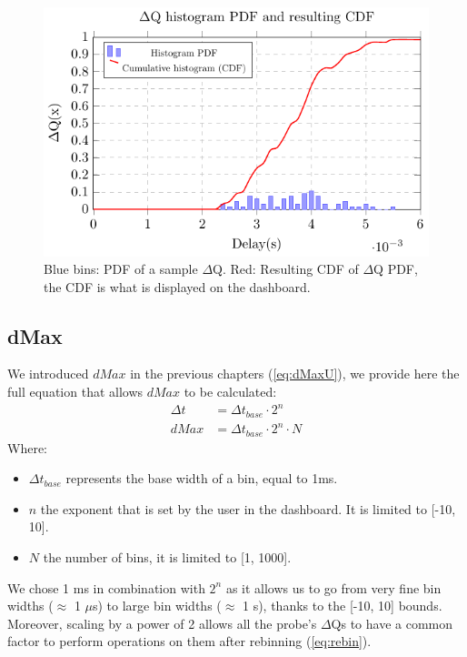     \begin{figure}[H]
            \begin{center}
                \includegraphics[scale=1]{tikz/pdf_dq.pdf} 
            \end{center}
            \caption{Blue bins: PDF of a sample $\Delta$Q. Red: Resulting CDF of $\Delta$Q PDF, the CDF is what is displayed on the dashboard.}
        \end{figure}

    \subsection{dMax}
        We introduced $dMax$ in the previous chapters (\cref{eq:dMaxU}), we provide here the full equation that allows $dMax$ to be calculated:
        \begin{equation}
            \begin{split}
                \Delta t &= \Delta t_{base} \cdot 2^n \\ 
                dMax &= \Delta t_{base} \cdot 2^n \cdot N  
            \end{split}
            \label{eq:dMaxU}
        \end{equation}
        Where:
        \begin{itemize}
            \item $\Delta t_{base}$ represents the base width of a bin, equal to 1ms.
            \item $n$ the exponent that is set by the user in the dashboard. It is limited to [-10, 10].
            \item $N$ the number of bins, it is limited to [1, 1000].
        \end{itemize}
            We chose 1 ms in combination with $2^n$ as it allows us to go from very fine bin widths ($\approx$ 1 $\mu$s) to large bin widths ($\approx$ 1 s), thanks to the [-10, 10] bounds. Moreover, scaling by a power of 2 allows all the probe's $\Delta$Qs to have a common factor to perform operations on them after rebinning (\cref{eq:rebin}).

